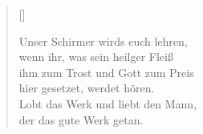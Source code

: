 \begin{center}
\settowidth{\versewidth}{Der, vor dem die Welt erschrickt,}
\begin{verse}[\versewidth]


 Unser Schirmer wirds euch lehren,\\
wenn ihr, was sein heilger Fleiß\\
ihm zum Trost und Gott zum Preis\\
hier gesetzet, werdet hören.\\
Lobt das Werk und liebt den Mann,\\
der das gute Werk getan.

  
\end{verse}
\end{center}




